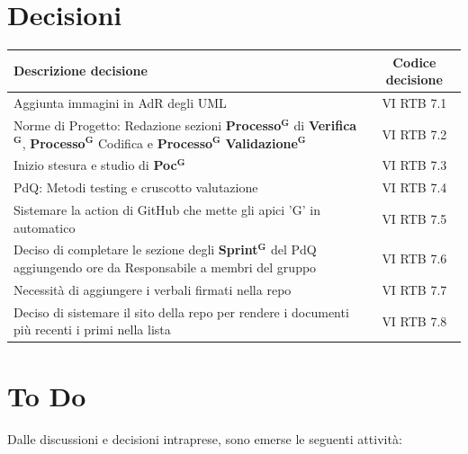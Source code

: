 \documentclass[a4paper,12pt]{article}
\newcommand{\term}[1]{\textbf{#1}$^\mathbf{G}$}
\newcommand{\ignoreglossary}{}
\begin{document}
\section{Decisioni}
\begin{center}
\small
\renewcommand{\arraystretch}{1.2} 
\begin{tabular}{|p{}|c|}
\hline
\rowcolor{gray!60} 
\textbf{Descrizione decisione} & \textbf{Codice decisione} \\
\hline
\rowcolor{white}
Aggiunta immagini in AdR degli UML & VI \ignoreglossary{RTB} 7.1 \\
\hline
\rowcolor{gray!20}
Norme di Progetto: Redazione sezioni \term{Processo} di \term{Verifica}, \term{Processo} Codifica e \term{Processo} \term{Validazione} &  VI \ignoreglossary{RTB} 7.2 \\
\hline
\rowcolor{white}
Inizio stesura e studio di \term{Poc} &  VI \ignoreglossary{RTB} 7.3\\
\hline
\rowcolor{gray!20}
PdQ: Metodi testing e cruscotto valutazione &  VI \ignoreglossary{RTB} 7.4 \\
\hline
\rowcolor{white}
Sistemare la action di GitHub che mette gli apici 'G' in automatico &  VI \ignoreglossary{RTB} 7.5\\
\hline
\rowcolor{gray!20}
Deciso di completare le sezione degli \term{Sprint} del PdQ aggiungendo ore da Responsabile a membri del gruppo &  VI \ignoreglossary{RTB} 7.6 \\
\hline
\rowcolor{white}
Necessità di aggiungere i verbali firmati nella repo &  VI \ignoreglossary{RTB} 7.7\\
\hline
\rowcolor{gray!20}
Deciso di sistemare il sito della repo per rendere i documenti più recenti i primi nella lista &  VI \ignoreglossary{RTB} 7.8 \\
\hline
\end{tabular}
\end{center}

\section{To Do}
Dalle discussioni e decisioni intraprese, sono emerse le seguenti attività:
\end{document}
